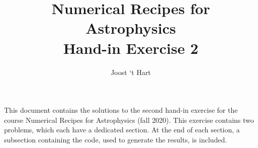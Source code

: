 \documentclass[a4paper,10pt]{article}
\title{Numerical Recipes for Astrophysics \\Hand-in Exercise 2}
\author{Joost `t Hart}
\begin{document}
\maketitle
\noindent
This document contains the solutions to the second hand-in exercise for the course Numerical Recipes for Astrophysics (fall 2020).  This exercise contains two problems, which each have a dedicated section. At the end of each section, a subsection containing the code, used to generate the results, is included.




\end{document}
